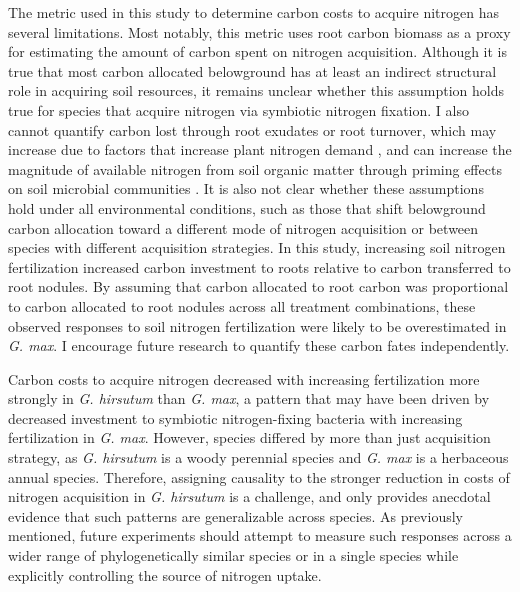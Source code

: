 The metric used in this study to determine carbon costs to acquire nitrogen has several limitations. Most notably, this metric uses root carbon biomass as a proxy for estimating the amount of carbon spent on nitrogen acquisition. Although it is true that most carbon allocated belowground has at least an indirect structural role in acquiring soil resources, it remains unclear whether this assumption holds true for species that acquire nitrogen via symbiotic nitrogen fixation. I also cannot quantify carbon lost through root exudates or root turnover, which may increase due to factors that increase plant nitrogen demand , and can increase the magnitude of available nitrogen from soil organic matter through priming effects on soil microbial communities . It is also not clear whether these assumptions hold under all environmental conditions, such as those that shift belowground carbon allocation toward a different mode of nitrogen acquisition  or between species with different acquisition strategies. In this study, increasing soil nitrogen fertilization increased carbon investment to roots relative to carbon transferred to root nodules. By assuming that carbon allocated to root carbon was proportional to carbon allocated to root nodules across all treatment combinations, these observed responses to soil nitrogen fertilization were likely to be overestimated in \textit{G. max}. I encourage future research to quantify these carbon fates independently.

Carbon costs to acquire nitrogen decreased with increasing fertilization more strongly in \textit{G. hirsutum} than \textit{G. max}, a pattern that may have been driven by decreased investment to symbiotic nitrogen-fixing bacteria with increasing fertilization in \textit{G. max}. However, species differed by more than just acquisition strategy, as \textit{G. hirsutum} is a woody perennial species and \textit{G. max} is a herbaceous annual species. Therefore, assigning causality to the stronger reduction in costs of nitrogen acquisition in \textit{G. hirsutum} is a challenge, and only provides anecdotal evidence that such patterns are generalizable across species. As previously mentioned, future experiments should attempt to measure such responses across a wider range of phylogenetically similar species or in a single species while explicitly controlling the source of nitrogen uptake.

